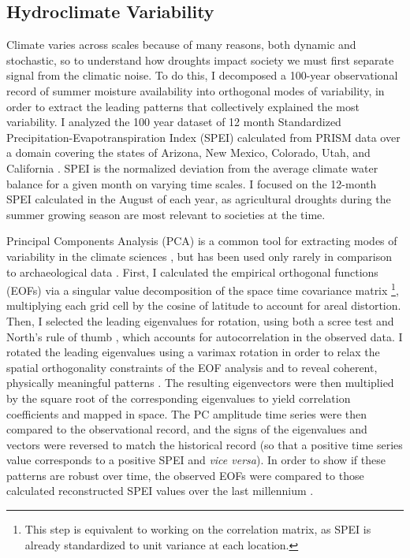 \documentclass[10pt]{iopart}
\begin{document}
\subsection*{Hydroclimate Variability}
Climate varies across scales because of many reasons, both dynamic and stochastic, so to understand how droughts impact society we must first separate signal from the climatic noise. To do this, I decomposed a 100-year observational record of summer moisture availability into orthogonal modes of variability, in order to extract the leading patterns that collectively explained the most variability. I analyzed the 100 year dataset of 12 month Standardized Precipitation-Evapotranspiration Index (SPEI) calculated from PRISM data over a domain covering the states of Arizona, New Mexico, Colorado, Utah, and California \parencite{daly}. SPEI is the normalized deviation from the average climate water balance for a given month on varying time scales. I focused on the 12-month SPEI calculated in the August of each year, as agricultural droughts during the summer growing season are most relevant to societies at the time.

Principal Components Analysis (PCA) is a common tool for extracting modes of variability in the climate sciences \parencite{lorenz,Hannachi2007}, but has been used only rarely in comparison to archaeological data \parencite{Weiss1982, Cordell2007}. First, I calculated the empirical orthogonal functions (EOFs) via a singular value decomposition of the space time covariance matrix \footnote{This step is equivalent to working on the correlation matrix, as SPEI is already standardized to unit variance at each location.}, multiplying each grid cell by the cosine of latitude to account for areal distortion. Then, I selected the leading eigenvalues for rotation, using both a scree test and North's rule of thumb \parencite{North1982}, which accounts for autocorrelation in the observed data. I rotated the leading eigenvalues using a varimax rotation in order to relax the spatial orthogonality constraints of the EOF analysis and to reveal coherent, physically meaningful patterns \parencite{Richman1986}. The resulting eigenvectors were then multiplied by the square root of the corresponding eigenvalues to yield correlation coefficients and mapped in space. The PC amplitude time series were then compared to the observational record, and the signs of the eigenvalues and vectors were reversed to match the historical record (so that a positive time series value corresponds to a positive SPEI and \textit{vice versa}). In order to show if these patterns are robust over time, the observed EOFs were compared to those calculated reconstructed SPEI values over the last millennium \parencite{Steiger2018}.
\end{document}
